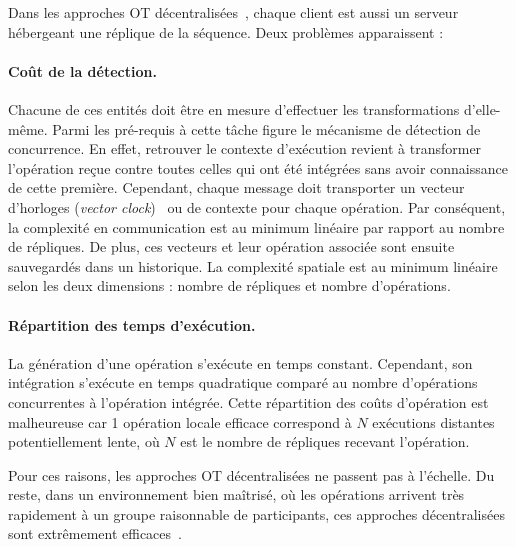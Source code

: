 
Dans les approches OT décentralisées~\cite{sun2009contextbased}, chaque client
est aussi un serveur hébergeant une réplique de la séquence. Deux problèmes
apparaissent : 

\paragraph{Coût de la détection.} Chacune de ces entités doit être en mesure
d'effectuer les transformations d'elle-même. Parmi les pré-requis à cette tâche
figure le mécanisme de détection de concurrence. En effet, retrouver le contexte
d'exécution revient à transformer l'opération reçue contre toutes celles qui ont
été intégrées sans avoir connaissance de cette première. Cependant, chaque
message doit transporter un vecteur d'horloges (\emph{vector
  clock})~\cite{lamport1978time} ou de contexte pour chaque opération. Par
conséquent, la complexité en communication est au minimum linéaire par rapport
au nombre de répliques.  De plus, ces vecteurs et leur opération associée sont
ensuite sauvegardés dans un historique. La complexité spatiale est au minimum
linéaire selon les deux dimensions : nombre de répliques et nombre d'opérations.

\paragraph{Répartition des temps d'exécution.} La génération d'une opération
s'exécute en temps constant. Cependant, son intégration s'exécute en temps
quadratique comparé au nombre d'opérations concurrentes à l'opération
intégrée. Cette répartition des coûts d'opération est malheureuse car 1
opération locale efficace correspond à $N$ exécutions distantes potentiellement
lente, où $N$ est le nombre de répliques recevant l'opération.

Pour ces raisons, les approches OT décentralisées ne passent pas à l'échelle. Du
reste, dans un environnement bien maîtrisé, où les opérations arrivent très
rapidement à un groupe raisonnable de participants, ces approches décentralisées
sont extrêmement efficaces~\cite{mehdi2014merging}.

